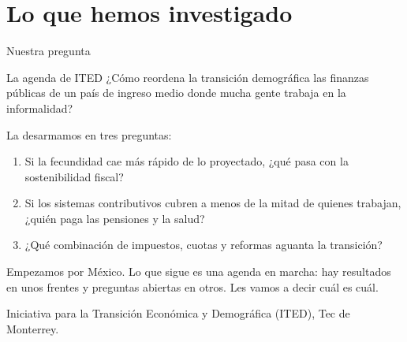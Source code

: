 \documentclass[aspectratio=169,11pt]{beamer}
\newcommand{\fuente}[1]{\par\vfill{\small\color{cGris}#1\par}}
\begin{document}
\section{Lo que hemos investigado}

\begin{frame}{Nuestra pregunta}
  \begin{alertblock}{La agenda de ITED}
    ¿Cómo reordena la transición demográfica las finanzas públicas de un país de ingreso medio donde mucha gente trabaja en la informalidad?
  \end{alertblock}
  \pause
  \medskip
  La desarmamos en tres preguntas:
  \begin{enumerate}
    \item Si la fecundidad cae más rápido de lo proyectado, ¿qué pasa con la sostenibilidad fiscal?
    \item Si los sistemas contributivos cubren a menos de la mitad de quienes trabajan, ¿quién paga las pensiones y la salud?
    \item ¿Qué combinación de impuestos, cuotas y reformas aguanta la transición?
  \end{enumerate}
  \pause
  \medskip
  Empezamos por México. Lo que sigue es una agenda en marcha: hay resultados en unos frentes y preguntas abiertas en otros. Les vamos a decir cuál es cuál.
  \fuente{Iniciativa para la Transición Económica y Demográfica (ITED), Tec de Monterrey.}
\end{frame}
\end{document}
